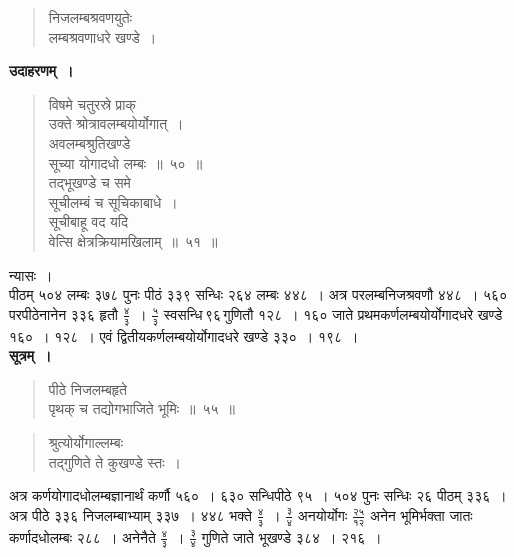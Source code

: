\documentclass[11pt, openany]{book}
\begin{document}
\newpage%

\begin{quote}
    \bs 
निजलम्बश्रवणयुतेः \\
लम्बश्रवणाधरे खण्डे~।
\end{quote}

 \textbf{उदाहरणम्~।} 
 \begin{quote}
     \bqt 
विषमे चतुरस्रे प्राक् \\
उक्ते श्रोत्रावलम्बयोर्योगात्~।\\
अवलम्बश्रुतिखण्डे \\
सूच्या योगादधो लम्बः~॥~५०~॥\\
तद्भूखण्डे च समे \\
सूचीलम्बं च सूचिकाबाधे~।\\
सूचीबाहू वद यदि \\
वेत्सि क्षेत्रक्रियामखिलाम्~॥~५१~॥
 \end{quote}
 
 न्यासः~। \\

\vspace{-4mm}
 पीठम् ५०४ लम्बः ३७८ पुनः पीठं ३३९ सन्धिः २६४ लम्बः
४४८~। अत्र परलम्बनिजश्रवणौ ४४८~। ५६० परपीठेनानेन ३३६
हृतौ $\frac{\mbox{४}}{\mbox{३}}$~। 
$\frac{\mbox{५}}{\mbox{३}}$
स्वसन्धि\textendash \,९६\textendash \,गुणितौ १२८~। १६० जाते प्रथमकर्णलम्बयोर्योगादधरे खण्डे १६०~। १२८~। एवं द्वितीयकर्णलम्बयोर्योगादधरे खण्डे ३३०~। १९८~। \\

 \textbf{सूत्रम्~।} 
\begin{quote}
     \bs 
पीठे निजलम्बहृते \\
पृथक् च तद्योगभाजिते भूमिः~॥~५५~॥
\end{quote}
 
 
\newpage

\begin{quote}
     \bs 
 श्रुत्योर्योगाल्लम्बः \\
 तद्गुणिते ते कुखण्डे स्तः~।
\end{quote}

 अत्र कर्णयोगादधोलम्बज्ञानार्थं कर्णौ ५६०~। ६३० सन्धिपीठे
९५~। ५०४ पुनः सन्धिः २६ पीठम् ३३६~। अत्र पीठे ३३६ निजलम्बाभ्याम् ३३७~। ४४८ भक्ते $\frac{\mbox{४}}{\mbox{३}}$~। $\frac{\mbox{३}}{\mbox{४}}$ अनयोर्योगः $\frac{\mbox{२५}}{\mbox{१२}}$ अनेन भूमिर्भक्ता जातः कर्णादधोलम्बः २८८~। अनेनैते $\frac{\mbox{४}}{\mbox{३}}$~। $\frac{\mbox{३}}{\mbox{४}}$ गुणिते 
जाते भूखण्डे ३८४~। २१६~। \\
\end{document}
